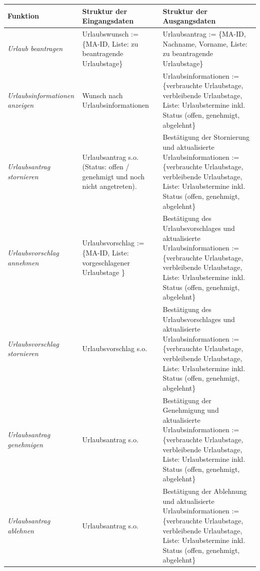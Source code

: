 \newpage
{
\hspace{-2cm}
\footnotesize
\begin{tabular}{|p{3cm}|p{6cm}|p{6cm}|}
	\hline
		\textbf{Funktion	} &	
		\textbf{Struktur der Eingangsdaten} &
		\textbf{Struktur der Ausgangsdaten} \\
	\hline \hline		
	\textit{Urlaub beantragen} &
		Urlaubswunsch := \{MA-ID, Liste: zu beantragende Urlaubstage\}&
		Urlaubsantrag := \{MA-ID, Nachname, Vorname, Liste: zu beantragende Urlaubstage\}\\
	\hline
		\textit{Urlaubsinformationen anzeigen} &
		Wunsch nach Urlaubsinformationen &
		Urlaubsinformationen := \{verbrauchte Urlaubstage, verbleibende Urlaubstage, Liste: Urlaubstermine inkl. Status (offen, genehmigt, abgelehnt\}\\
	\hline		
		\textit{Urlaubsantrag \newline stornieren} &
		Urlaubsantrag s.o. (Status: offen / genehmigt und noch nicht angetreten).&
		Best\"atigung der Stornierung und aktualisierte Urlaubsinformationen := \{verbrauchte Urlaubstage, verbleibende Urlaubstage, Liste: Urlaubstermine inkl. Status (offen, genehmigt, abgelehnt\}\\
	\hline
		\textit{Urlaubsvorschlag \newline annehmen} &
		Urlaubsvorschlag := \{MA-ID, Liste: vorgeschlagener Urlaubstage \}&
		Best\"atigung des Urlaubsvorschlages und aktualisierte Urlaubsinformationen := \{verbrauchte Urlaubstage, verbleibende Urlaubstage, Liste: Urlaubstermine inkl. Status (offen, genehmigt, abgelehnt\}\\
	\hline
		\textit{Urlaubsvorschlag \newline stornieren} &
		Urlaubsvorschlag s.o.&
		Best\"atigung des Urlaubsvorschlages und aktualisierte Urlaubsinformationen := \{verbrauchte Urlaubstage, verbleibende Urlaubstage, Liste: Urlaubstermine inkl. Status (offen, genehmigt, abgelehnt\}\\
	\hline 
	\hline
		\textit{Urlaubsantrag \newline genehmigen} &
		Urlaubsantrag s.o. &
		Best\"atigung der Genehmigung und aktualisierte Urlaubsinformationen := \{verbrauchte Urlaubstage, verbleibende Urlaubstage, Liste: Urlaubstermine inkl. Status (offen, genehmigt, abgelehnt\}\\
	\hline
		\textit{Urlaubsantrag \newline ablehnen} &
		Urlaubsantrag s.o. &
		Best\"atigung der Ablehnung und aktualisierte Urlaubsinformationen := \{verbrauchte Urlaubstage, verbleibende Urlaubstage, Liste: Urlaubstermine inkl. Status (offen, genehmigt, abgelehnt\}\\

\end{tabular}}
